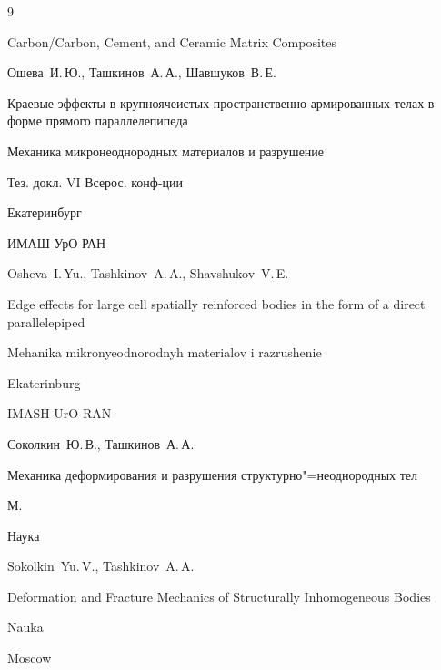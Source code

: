 \begin{thebibliography}{9}


\volinfo Carbon/Carbon, Cement, and Ceramic Matrix Composites





\by Ошева~И.\,Ю., Ташкинов~А.\,А., Шавшуков~В.\,Е.

\paper Краевые эффекты в крупноячеистых пространственно армированных телах в форме прямого параллелепипеда

\inbook Механика микронеоднородных материалов и разрушение

\bookinfo Тез. докл. VI Всерос. конф-ции

\publaddr Екатеринбург

\publ ИМАШ УрО РАН



\misctransl

\by Osheva~I.\,Yu., Tashkinov~A.\,A., Shavshukov~V.\,E.

\paper Edge effects for large cell spatially reinforced bodies in the form of a direct parallelepiped

\inbook Mehanika mikronyeodnorodnyh materialov i razrushenie

\publaddr Ekaterinburg

\publ IMASH UrO RAN










\by Соколкин~Ю.\,В., Ташкинов~А.\,А.

\book Механика деформирования и разрушения структурно"=неоднородных тел

\publaddr М.

\publ Наука



\misctransl

\by Sokolkin~Yu.\,V., Tashkinov~A.\,A.

\book Deformation and Fracture Mechanics of Structurally Inhomogeneous Bodies

\publ Nauka

\publaddr Moscow







\end{thebibliography}



\noindent

\hskip6.5cm \thedate \par\noindent

\hskip6.5cm\therevdate





\makeengtitle



\newpage



%

